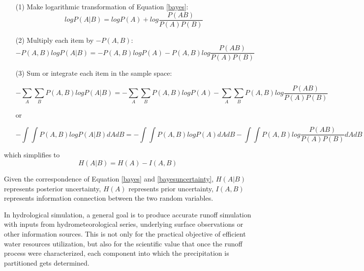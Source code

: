 \documentclass[review]{elsarticle}
\begin{document}
\begin{itemize}
\item[(1)] Make logarithmic transformation of Equation \ref{bayes}:
\begin{equation}
\label{log}
logP(A|B) =logP(A)+log \frac{P (AB)}{P(A)P(B)} 
\end{equation}
\item[(2)] Multiply each item by $-P(A,B)$:
\begin{equation}
\label{element}
-P(A,B)logP(A|B) =-P(A,B) logP(A)-P(A,B) log \frac{P (AB)}{P(A)P(B)} 
\end{equation} 
\item[(3)] Sum or integrate each item in the sample space:
\begin{small}
\begin{equation}
\label{element1}
-\sum_{A} \sum_{B} P(A,B)logP(A|B) =-\sum_{A} \sum_{B} P(A,B) logP(A)-\sum_{A} \sum_{B} P(A,B) log \frac{P (AB)}{P(A)P(B)} 
\end{equation} 
\end{small}
or
\begin{small}
\begin{equation}
\label{element2}
-\int\int P(A,B)logP(A|B)dAdB =-\int \int P(A,B)logP(A)dAdB -\int \int P(A,B)log \frac{P (AB)}{P(A)P(B)}dAdB
\end{equation}
\end{small}
\end{itemize}
which simplifies to  
\begin{equation}
\label{bayesuncertainty}
H(A|B) = H(A)-I(A,B)
\end{equation}

Given the correspondence of  Equation \ref{bayes} and \ref{bayesuncertainty}, $H(A|B)$  represents posterior uncertainty, $H(A)$ represents prior uncertainty, $I(A,B)$ represents information connection between the two random variables. 

In hydrological simulation, a general goal is to produce accurate runoff simulation with inputs from hydrometeorological series, underlying surface observations or other information sources. This is not only for the practical objective of efficient water resources utilization, but also for the scientific value that once the runoff process were characterized, each component into which the precipitation is partitioned gets determined. 
\end{document}
